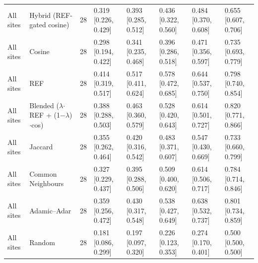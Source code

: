 \begin{table}[t]
{\begin{tabular}{llrlllll}
All sites & Hybrid (REF-gated cosine) & 28 & 0.319 [0.226, 0.429] & 0.393 [0.285, 0.512] & 0.436 [0.322, 0.560] & 0.484 [0.370, 0.608] & 0.655 [0.607, 0.706] \\
All sites & Cosine & 28 & 0.298 [0.194, 0.422] & 0.341 [0.235, 0.468] & 0.396 [0.286, 0.518] & 0.471 [0.356, 0.597] & 0.735 [0.693, 0.779] \\
All sites & REF & 28 & 0.414 [0.319, 0.517] & 0.517 [0.411, 0.624] & 0.578 [0.472, 0.685] & 0.644 [0.537, 0.750] & 0.798 [0.740, 0.854] \\
All sites & Blended ($\lambda$$\cdot$REF + (1$-$$\lambda$)$\cdot$cos) & 28 & 0.388 [0.288, 0.503] & 0.463 [0.360, 0.579] & 0.528 [0.420, 0.643] & 0.614 [0.501, 0.727] & 0.820 [0.771, 0.866] \\
All sites & Jaccard & 28 & 0.355 [0.262, 0.464] & 0.420 [0.316, 0.542] & 0.483 [0.371, 0.607] & 0.547 [0.430, 0.669] & 0.733 [0.660, 0.799] \\
All sites & Common Neighbours & 28 & 0.327 [0.229, 0.437] & 0.395 [0.288, 0.506] & 0.509 [0.400, 0.620] & 0.614 [0.506, 0.717] & 0.784 [0.714, 0.846] \\
All sites & Adamic--Adar & 28 & 0.359 [0.256, 0.472] & 0.430 [0.317, 0.548] & 0.538 [0.427, 0.649] & 0.638 [0.532, 0.737] & 0.801 [0.734, 0.859] \\
All sites & Random & 28 & 0.181 [0.086, 0.299] & 0.197 [0.097, 0.320] & 0.226 [0.123, 0.353] & 0.274 [0.170, 0.401] & 0.500 [0.500, 0.500] \\
\bottomrule
\end{tabular}}
\end{table}
